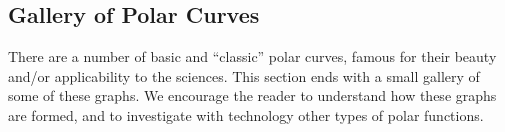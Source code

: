 \subsection{Gallery of Polar Curves}

There are a number of basic and ``classic'' polar curves, famous for their beauty and/or applicability to the sciences.  This section ends with a small gallery of some of these graphs. We encourage the reader to understand how these graphs are formed, and to investigate with technology other types of polar functions.

\newlength{\gallerywidth}
\setlength{\gallerywidth}{(0pt+\marginparwidth+\textwidth)/4}

